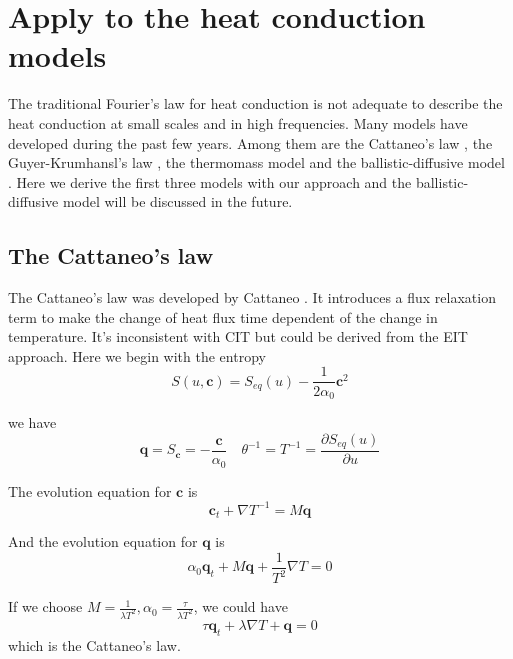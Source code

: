 \documentclass[a4paper]{article}
\begin{document}
\section{Apply to the heat conduction models}
The traditional Fourier's law for heat conduction is not adequate to describe the heat conduction at small scales and in high frequencies. Many models have developed during the past few years. Among them are the Cattaneo's law \cite{cattaneo2011sulla}, the Guyer-Krumhansl's law \cite{guyer1966solution}, the thermomass model \cite{zeng2006motion,dong2011generalized} and the ballistic-diffusive model \cite{chen2002ballistic,chen2001ballistic}. Here we derive the first three models with our approach and the ballistic-diffusive model will be discussed in the future. 

\subsection{The Cattaneo's law}

The Cattaneo's law was developed by Cattaneo \cite{cattaneo2011sulla}. It introduces a flux relaxation term to make the change of heat flux time dependent of the change in temperature. It's inconsistent with CIT but could be derived from the EIT approach. Here we begin with the entropy 
\begin{equation}
S(u,\mathbf{c})=S_{eq}(u)-\frac{1}{2\alpha_0} \mathbf{c}^2
\end{equation}

we have
\begin{equation}
\mathbf{q}=S_{\mathbf{c}}=-\frac{\mathbf{c}}{\alpha_0} \quad \theta^{-1}=T^{-1}=\frac{\partial S_{eq}(u)}{\partial u}
\end{equation}

The evolution equation for $\mathbf{c}$ is 
\begin{equation}
\mathbf{c}_t+\nabla T^{-1} =M\mathbf{q}
\end{equation}

And the evolution equation for $\mathbf{q}$ is
\begin{equation}
{\alpha_0}\mathbf{q}_t + M \mathbf{q} + \frac{1}{T^2} \nabla T=0
\end{equation}

If we choose $M=\frac{1}{\lambda T^2},\alpha_0=\frac{\tau}{\lambda T^2}$, we could have 
\begin{equation}
\tau \mathbf{q}_t + \lambda \nabla T+\mathbf{q}=0
\end{equation}
which is the Cattaneo's law.
\end{document}
